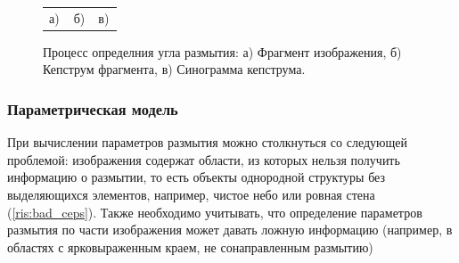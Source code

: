 \begin{figure}[H]
\begin{minipage}[h]{0.32\linewidth}
\end{minipage}
\hfill
\begin{minipage}[h]{0.32\linewidth}
\end{minipage}
\begin{minipage}[h]{1\linewidth}
\begin{tabular}{p{0.32\linewidth}p{0.32\linewidth}p{0.32\linewidth}}
\centering а) & \centering б) & \centering в) \\
\end{tabular}
\end{minipage}
\vspace*{-1cm}
\caption{Процесс определния угла размытия: а) Фрагмент изображения, б) Кепструм фрагмента, в) Синограмма кепструма.}
\label{ris:correlationsignals}
\end{figure}

\subsubsection{Параметрическая модель}
При вычислении параметров размытия можно столкнуться со следующей проблемой: 
изображения содержат области, из которых нельзя получить информацию о размытии, 
то есть объекты однородной структуры без выделяющихся элементов, например, 
чистое небо или ровная стена (\ref{ris:bad_ceps}). Также необходимо учитывать, что определение параметров 
размытия по части изображения может давать ложную информацию (например, в областях с ярковыраженным  краем, не сонаправленным размытию)

